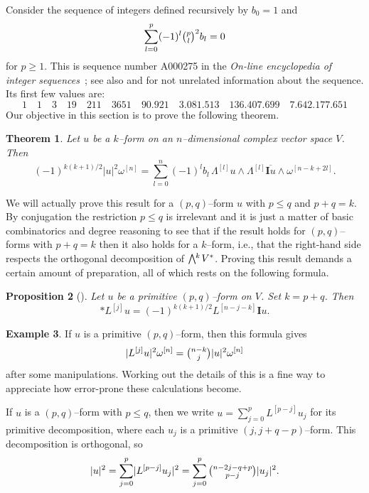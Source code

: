 \documentclass[11pt,a4paper]{amsart}
\def\^#1{^{[#1]}}
\def\bw#1{\bigwedge{}^{\mkern-5mu #1}\mkern2mu}
\def\I{\mathbf{I}}
\newtheorem{theo}{Theorem}[section]
\newtheorem{prop}[theo]{Proposition}
\theoremstyle{definition}
\newtheorem{exam}[theo]{Example}
\theoremstyle{remark}
\numberwithin{equation}{section}
\begin{document}
Consider the sequence of integers defined recursively by $b_0 = 1$ and
\begin{equation}
\label{bezel}
\sum_{l=0}^{p} (-1)^{l} \tbinom{p}{l}^2 b_l = 0
\end{equation}
for $p \geq 1$. This is sequence number A000275 in the \textsl{On-line
encyclopedia of integer sequences}~\cite{OEIS}; see also \cite{Carlitz}
and \cite{Riordan} for not unrelated information about the sequence.
Its first few values are: 
$$
1 \quad 1 \quad 3 \quad 19 \quad 211 \quad 3651 \quad
90.921 \quad 3.081.513 \quad 136.407.699 \quad 7.642.177.651
$$
Our objective in this section is to prove the following theorem.


\begin{theo}
    \label{thm:norm}
Let $u$ be a $k$--form on an $n$--dimensional complex vector
space $V$. Then
$$
    (-1)^{k(k+1)/2}
    \lvert u \rvert^2 \omega\^n
    = \sum_{l=0}^n (-1)^{l} b_l \, 
    \Lambda\^l u \wedge \Lambda\^l \overline{\I u}
    \wedge \omega\^{n-k+2l}.
$$
\end{theo}

We will actually prove this result for a $(p,q)$--form $u$ with $p \leq q$
and $p+q = k$. By conjugation the restriction $p \leq q$ is irrelevant and
it is just a matter of basic combinatorics and degree reasoning to see
that if the result holds for $(p,q)$--forms with $p + q = k$ then it also
holds for a $k$--form, i.e., that the right-hand side respects the
orthogonal decomposition of $\bw{k}V^*$.  Proving this result demands a
certain amount of preparation, all of which rests on the following formula.


\begin{prop}[{{\cite[Proposition~1.67]{Huy}}}]
Let $u$ be a primitive $(p,q)$--form on $V$. Set $k = p+q$. Then
$$
    * L\^{j} u = (-1)^{k(k+1)/2} L\^{n-j-k} \I u.
$$
\end{prop}


\begin{exam}
If $u$ is a primitive $(p,q)$--form, then this formula gives
$$
\lvert L\^{j} u \rvert^2 \omega\^{n}
= \tbinom{n-k}{j} \lvert u \rvert^2 \omega\^{n}
$$
after some manipulations. Working out the details of this is a fine way to
appreciate how error-prone these calculations become.
\end{exam}


If $u$ is a $(p,q)$--form with $p \leq q$, then we write $u =
\sum_{j=0}^p L\^{p-j} u_j$ for its primitive decomposition, where each
$u_j$ is a primitive $(j,j+q-p)$--form. This decomposition is
orthogonal, so
$$
\lvert u \rvert^2
= \sum_{j=0}^p \lvert L\^{p-j} u_j \rvert^2
= \sum_{j=0}^p \tbinom{n-2j-q+p}{p-j} \lvert u_j \rvert^2.
$$
\end{document}
